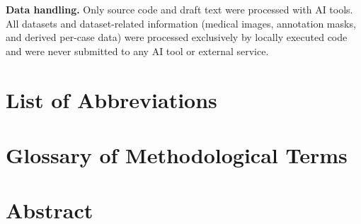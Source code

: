 \vspace{0.4cm}
\noindent\textbf{Data handling.} Only source code and draft text were processed with AI tools. All datasets and dataset-related information (medical images, annotation masks, and derived per-case data) were processed exclusively by locally executed code and were never submitted to any AI tool or external service.

\tableofcontents
\listoftables
\listoffigures
\listofgraphs
\listofcharts

\chapter*{List of Abbreviations}


\chapter*{Glossary of Methodological Terms}


\chapter*{Abstract}


\cleardoublepage
